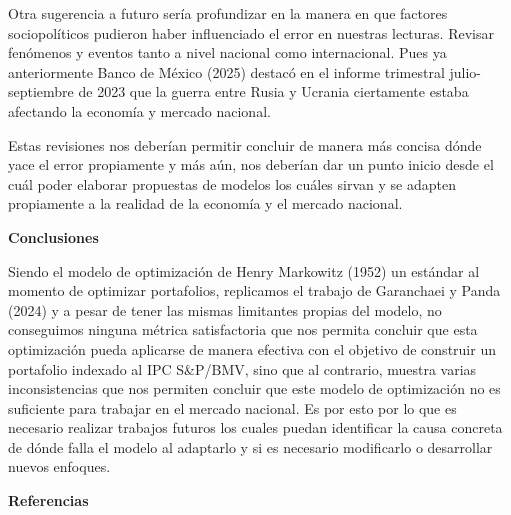 \documentclass[
]{article}
\begin{document}
Otra sugerencia a futuro sería profundizar en la manera en que factores
sociopolíticos pudieron haber influenciado el error en nuestras lecturas. Revisar
fenómenos y eventos tanto a nivel nacional como internacional. Pues ya
anteriormente Banco de México (2025) destacó en el informe trimestral julio-
septiembre de 2023 que la guerra entre Rusia y Ucrania ciertamente estaba
afectando la economía y mercado nacional.

Estas revisiones nos deberían permitir concluir de manera más concisa dónde yace
el error propiamente y más aún, nos deberían dar un punto inicio desde el cuál poder
elaborar propuestas de modelos los cuáles sirvan y se adapten propiamente a la
realidad de la economía y el mercado nacional.

\textbf{Conclusiones}

Siendo el modelo de optimización de Henry Markowitz (1952) un estándar al
momento de optimizar portafolios, replicamos el trabajo de Garanchaei y Panda
(2024) y a pesar de tener las mismas limitantes propias del modelo, no conseguimos
ninguna métrica satisfactoria que nos permita concluir que esta optimización pueda
aplicarse de manera efectiva con el objetivo de construir un portafolio indexado al
IPC S&P/BMV, sino que al contrario, muestra varias inconsistencias que nos
permiten concluir que este modelo de optimización no es suficiente para trabajar en
el mercado nacional. Es por esto por lo que es necesario realizar trabajos futuros
los cuales puedan identificar la causa concreta de dónde falla el modelo al adaptarlo
y si es necesario modificarlo o desarrollar nuevos enfoques.

\textbf{Referencias}
\end{document}
